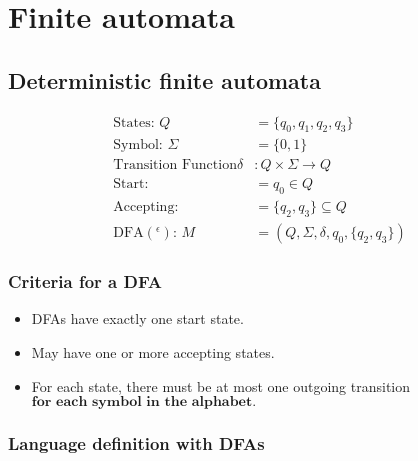 \documentclass{article}
\begin{document}
\section{Finite automata}

\subsection{Deterministic finite automata}

\begin{align*}
    \text{States: } Q                 & = \{q_0, q_1, q_2, q_3\}        \\
    \text{Symbol: } \Sigma            & = \{0, 1\}                      \\
    \text{Transition Function} \delta & : Q \times \Sigma \rightarrow Q \\
    \text{Start: }                    & = q_0 \in Q                     \\
    \text{Accepting: }                & = \{q_2, q_3\} \subseteq Q      \\
    \text{DFA$(^\epsilon)$: } M       & = (Q, \Sigma, \delta, q_0, \{q_2, q_3\})
\end{align*}



\subsubsection{Criteria for a DFA}

\begin{itemize}
    \item DFAs have exactly one start state.
    \item May have one or more accepting states.
    \item For each state, there must be at most one outgoing transition $\textbf{for each symbol in the alphabet.}$
\end{itemize}

\subsubsection{Language definition with DFAs}
\end{document}
